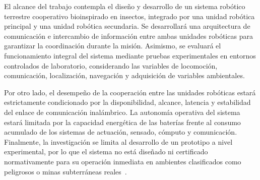 
El alcance del trabajo contempla el diseño y desarrollo de un sistema robótico terrestre cooperativo bioinspirado en insectos, integrado por una unidad robótica principal y una unidad robótica secundaria. Se desarrollará una arquitectura de comunicación e intercambio de información entre ambas unidades robóticas para garantizar la coordinación durante la misión. Asimismo, se evaluará el funcionamiento integral del sistema mediante pruebas experimentales en entornos controlados de laboratorio, considerando las variables de locomoción, comunicación, localización, navegación y adquisición de variables ambientales.

Por otro lado, el desempeño de la cooperación entre las unidades robóticas estará estrictamente condicionado por la disponibilidad, alcance, latencia y estabilidad del enlace de comunicación inalámbrico. La autonomía operativa del sistema estará limitada por la capacidad energética de las baterías frente al consumo acumulado de los sistemas de actuación, sensado, cómputo y comunicación. Finalmente, la investigación se limita al desarrollo de un prototipo a nivel experimental, por lo que el sistema no está diseñado ni certificado normativamente para su operación inmediata en ambientes clasificados como peligrosos o minas subterráneas reales~\cite{OSINERGMIN_DS024_Compilado,OSINERGMIN_BoletinGSM_2020}.

